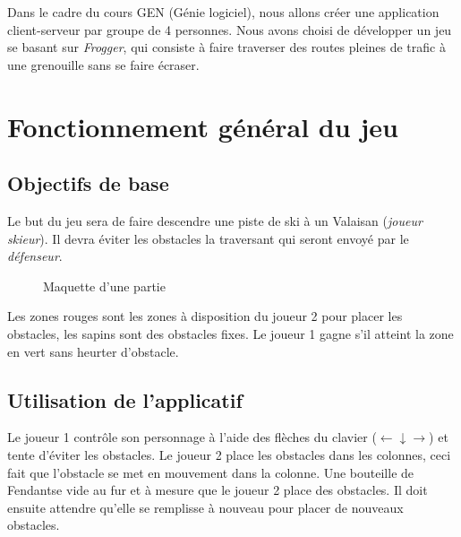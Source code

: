 \documentclass[a4paper,11pt]{article}
\begin{document}
	
	Dans le cadre du cours GEN (Génie logiciel), nous allons créer une application client-serveur par groupe de 4 personnes. Nous avons choisi de développer un jeu se basant sur \textit{Frogger}, qui consiste à faire traverser des routes pleines de trafic à une grenouille sans se faire écraser. 
	
	
	\section{Fonctionnement général du jeu}
	
	
	\subsection{Objectifs de base}
	
	Le but du jeu sera de faire descendre une piste de ski à un Valaisan (\textit{joueur skieur}). Il devra éviter les obstacles la traversant qui seront envoyé par le \textit{défenseur}.
	
	\begin{figure}[h!]
		\centering
		\caption{Maquette d'une partie}
		\label{fig:maquette}
	\end{figure}
	
	Les zones rouges sont les zones à disposition du joueur 2 pour placer les obstacles, les sapins sont des obstacles fixes. Le joueur 1 gagne s'il atteint la zone en vert sans heurter d'obstacle.
	
	
	\subsection{Utilisation de l'applicatif}
	Le joueur 1 contrôle son personnage à l'aide des flèches du clavier ($\leftarrow \downarrow \rightarrow$) et tente d'éviter les obstacles. Le joueur 2 place les obstacles dans les colonnes, ceci fait que l'obstacle se met en mouvement dans la colonne. Une bouteille de Fendant\texttrademark se vide au fur et à mesure que le joueur 2 place des obstacles. Il doit ensuite attendre qu'elle se remplisse à nouveau pour placer de nouveaux obstacles.\par
	
\end{document}

